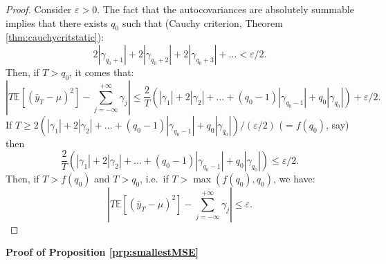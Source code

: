 \documentclass[
  12pt,
]{book}
\theoremstyle{definition}
\theoremstyle{definition}
\theoremstyle{definition}
\theoremstyle{definition}
\theoremstyle{remark}
\begin{document}
\begin{proof}
Consider \(\varepsilon > 0\). The fact that the autocovariances are absolutely summable implies that there exists \(q_0\) such that (Cauchy criterion, Theorem \ref{thm:cauchycritstatic}):
\[
2|\gamma_{q_0+1}|+2|\gamma_{q_0+2}|+2|\gamma_{q_0+3}|+\dots < \varepsilon/2.
\]
Then, if \(T > q_0\), it comes that:
\[
\left|T \mathbb{E}\left[(\bar{y}_T - \mu)^2\right] - \sum_{j=-\infty}^{+\infty} \gamma_j\right|\le \frac{2}{T}\left(|\gamma_1| + 2|\gamma_2| + \dots + (q_0-1)|\gamma_{q_0-1}| +q_0|\gamma_{q_0}|\right) + \varepsilon/2.
\]
If \(T \ge 2\left(|\gamma_1| + 2|\gamma_2| + \dots + (q_0-1)|\gamma_{q_0-1}| +q_0|\gamma_{q_0}|\right)/(\varepsilon/2)\) (\(= f(q_0)\), say) then
\[
\frac{2}{T}\left(|\gamma_1| + 2|\gamma_2| + \dots + (q_0-1)|\gamma_{q_0-1}| +q_0|\gamma_{q_0}|\right) \le \varepsilon/2.
\]
Then, if \(T>f(q_0)\) and \(T>q_0\), i.e.~if \(T>\max(f(q_0),q_0)\), we have:
\[
\left|T \mathbb{E}\left[(\bar{y}_T - \mu)^2\right] - \sum_{j=-\infty}^{+\infty} \gamma_j\right|\le \varepsilon.
\]
\end{proof}

\textbf{Proof of Proposition \ref{prp:smallestMSE}}
\end{document}
